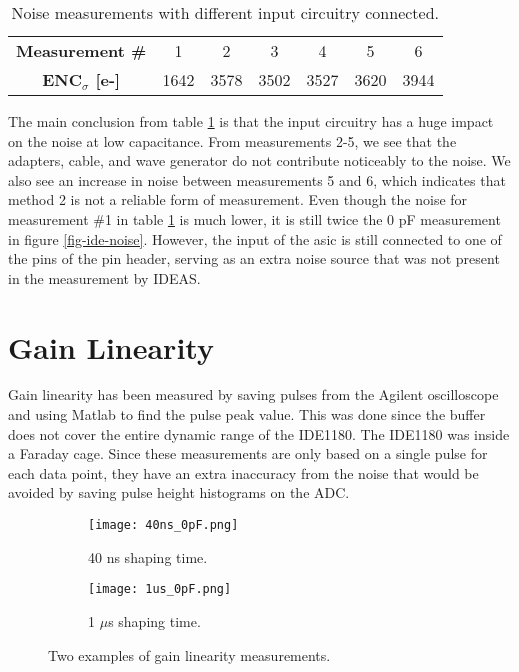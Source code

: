 \documentclass[../main/thesis.tex]{subfiles}
\begin{document}
\begin{table}[h!]
	\begin{center}
		\caption{Noise measurements with different input circuitry connected.}
		\label{tab-noise-input}
		\begin{tabular}{ccccccc}\toprule
			\textbf{Measurement \#}      & 1    & 2    & 3    & 4    & 5    & 6   \\ 
			\textbf{ENC$_\sigma$ [e-]} & 1642 & 3578 & 3502 & 3527 & 3620 & 3944   \\ \bottomrule
		\end{tabular}
	\end{center}
\end{table}

The main conclusion from table \ref{tab-noise-input} is that the input circuitry has a huge impact on the noise at low capacitance. From measurements 2-5, we see that the adapters, cable, and wave generator do not contribute noticeably to the noise. We also see an increase in noise between measurements 5 and 6, which indicates that method 2 is not a reliable form of measurement. Even though the noise for measurement \#1 in table \ref{tab-noise-input} is much lower, it is still twice the 0 pF measurement in figure \ref{fig-ide-noise}. However, the input of the \gls{asic} is still connected to one of the pins of the pin header, serving as an extra noise source that was not present in the measurement by IDEAS. 




\section{Gain Linearity}
\label{ide-linearity}

Gain linearity has been measured by saving pulses from the Agilent oscilloscope and using Matlab to find the pulse peak value. This was done since the buffer does not cover the entire dynamic range of the IDE1180. The IDE1180 was inside a Faraday cage. Since these measurements are only based on a single pulse for each data point, they have an extra inaccuracy from the noise that would be avoided by saving pulse height histograms on the ADC. 

\begin{figure} %
	\centering
	\begin{subfigure}{.5\textwidth}
		\centering
		\texttt{[image: 40ns\_0pF.png]}
		\caption{40 ns shaping time.}
		\label{fig-gainlin-40n}
	\end{subfigure}%
	\begin{subfigure}{.5\textwidth}
		\centering
		\texttt{[image: 1us\_0pF.png]}
		\caption{1 $\mu$s shaping time.}
		\label{fig-gainlin-1u} 
	\end{subfigure}
	\caption{Two examples of gain linearity measurements.}
	\label{fig-gainlin}
\end{figure}
\end{document}
